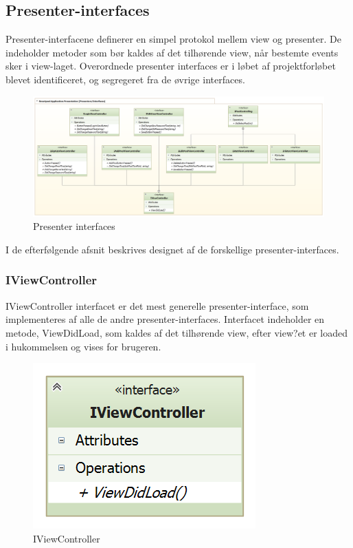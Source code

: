 \subsection{Presenter-interfaces}
Presenter-interfacene definerer en simpel protokol mellem view og presenter. De indeholder metoder som bør kaldes af det tilhørende view, når bestemte events sker i view-laget. Overordnede presenter interfaces er i løbet af projektforløbet blevet identificeret, og segregeret fra de øvrige interfaces.

\begin{figure}
	\centering
	\includegraphics[width=1.0\linewidth]{figs/design/application_presentation_interfaces}
	\caption{Presenter interfaces}
	\label{fig:application_presentation_interfaces}
\end{figure}

I de efterfølgende afsnit beskrives designet af de forskellige presenter-interfaces.

\subsubsection{IViewController}
IViewController interfacet er det mest generelle presenter-interface, som implementeres af alle de andre presenter-interfaces. Interfacet indeholder en metode, ViewDidLoad, som kaldes af det tilhørende view, efter view?et er loaded i hukommelsen og vises for brugeren.

\begin{figure}
	\centering
	\includegraphics[width=0.3\linewidth]{figs/design/application_iviewcontroller}
	\caption{IViewController}
	\label{fig:application_iviewcontroller}
\end{figure}

